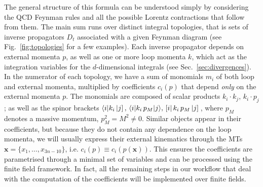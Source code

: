 \documentclass[main.tex]{subfiles}
\begin{document}
The general structure of this formula can be understood simply by considering the QCD Feynman rules and all the possible Lorentz contractions that follow from them. The main sum runs over distinct integral topologies, that is sets of inverse propagators $D_t$ associated with a given Feynman diagram (see Fig.~\ref{fig:topologies} for a few examples). Each inverse propagator depends on external momenta $p$, as well as one or more loop momenta $k$, which act as the integration variables for the $d$-dimensional integrals (see Sec.~\ref{sec:divergences}). In the numerator of each topology, we have a sum of monomials $m_i$ of both loop and external momenta, multiplied by coefficients $c_i(p)$ that depend \textit{only} on the external momenta $p$. The monomials are composed of scalar products $k_i \cdot k_j,\, k_i\cdot p_j$; as well as the spinor brackets $\langle i |k_i \left| j \right],\, \langle i|k_i \, p_M|j \rangle,\, \left[ i \right|k_i \, p_M \left| j \right]\,$, where $p_M$ denotes a massive momentum, $p_M^2 = M^2 \neq 0$. Similar objects appear in their coefficients, but because they do not contain any dependence on the loop momenta, we will usually express their external kinematics through the MTs $\mathbf{x} = \{x_1, \ldots, x_{3n-10}\}$, i.e. $c_i(p) \equiv c_i(p(\mathbf{x}))$. This ensures the coefficients are parametrised through a minimal set of variables and can be processed using the finite field framework. In fact, all the remaining steps in our workflow that deal with the computation of the coefficients will be implemented over finite fields. 
\end{document}
